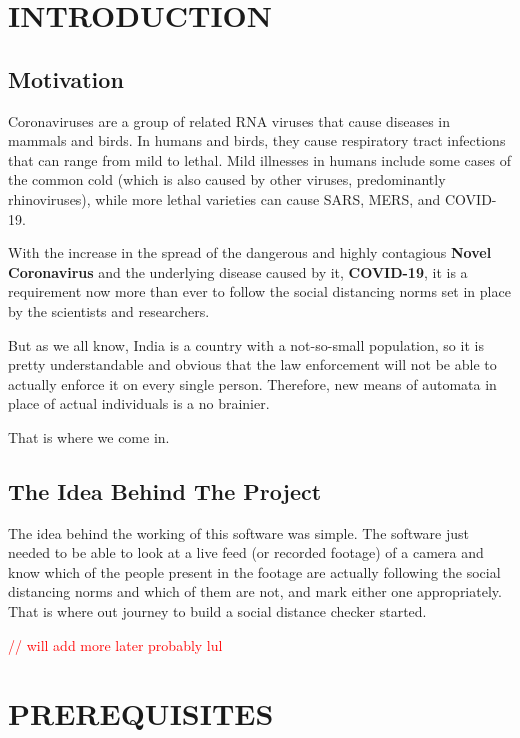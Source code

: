 \documentclass[a4paper]{article}
\begin{document}
\setcounter{page}{1}
\newpage
\setcounter{tocdepth}{2} %
\tableofcontents
\newpage

\setcounter{page}{1}

\section{INTRODUCTION}
\subsection{Motivation}
Coronaviruses are a group of related RNA viruses that cause diseases in mammals
and birds. In humans and birds, they cause respiratory tract infections that can
range from mild to lethal. Mild illnesses in humans include some cases of the
common cold (which is also caused by other viruses, predominantly rhinoviruses),
while more lethal varieties can cause SARS, MERS, and COVID-19.

With the increase in the spread of the dangerous and highly contagious \textbf{Novel Coronavirus}
and the underlying disease caused by it, \textbf{COVID-19},
it is a requirement now more than ever to follow the social distancing
norms set in place by the scientists and researchers.

But as we all know, India is a country with a not-so-small population,
so it is pretty understandable and obvious that the law enforcement will
not be able to actually enforce it on every single person. Therefore,
new means of automata in place of actual individuals is a no brainier.

That is where we come in.

\subsection{The Idea Behind The Project}
The idea behind the working of this software was simple. The software just needed
to be able to look at a live feed (or recorded footage) of a camera and know
which of the people present in the footage are actually following the social
distancing norms and which of them are not, and mark either one appropriately.
That is where out journey to build a social distance checker started.

\textcolor{red}{// will add more later probably lul}

\newpage

\section{PREREQUISITES}
\end{document}

